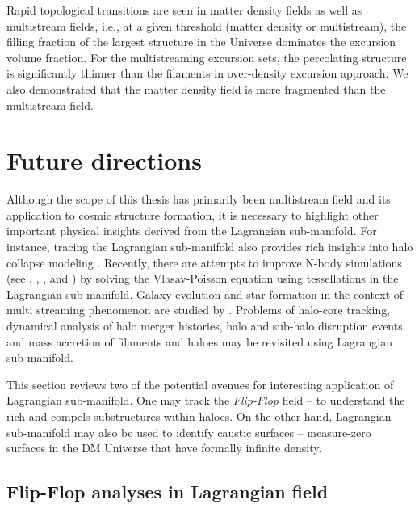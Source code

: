 Rapid topological transitions are seen in matter density fields as well as multistream fields, i.e., at a given threshold (matter density or multistream), the filling fraction of the largest structure in the Universe dominates the excursion volume fraction. For the multistreaming excursion sets, the percolating structure is significantly thinner than the filaments in over-density excursion approach. We also demonstrated that the matter density field is more fragmented than the multistream field. 
 

\section{Future directions}

Although the scope of this thesis has primarily been multistream field and its application to cosmic structure formation, it is necessary to highlight other important physical insights derived from the Lagrangian sub-manifold. For instance, tracing the Lagrangian sub-manifold also provides rich insights into halo collapse modeling \cite{Neyrinck2016}. Recently, there are attempts to improve N-body simulations (see \cite{Hahn2013}, \cite{Angulo2013a}, \cite{Angulo2013b}, \cite{Sousbie2015} and \cite{Hahn2016a}) by solving the Vlasav-Poisson equation using tessellations in the Lagrangian sub-manifold. Galaxy evolution and star formation in the context of multi streaming phenomenon are studied by \cite{Aragon-Calvo2016}. Problems of halo-core tracking, dynamical analysis of halo merger histories, halo and sub-halo disruption events and mass accretion of filaments and haloes may be revisited using Lagrangian sub-manifold.

This section reviews two of the potential avenues for interesting application of Lagrangian sub-manifold. One may track the {\it Flip-Flop} field -- to understand the rich and compels substructures within haloes. On the other hand, Lagrangian sub-manifold may also be used to identify caustic surfaces -- measure-zero surfaces in the DM Universe that have formally infinite density. 


\subsection{Flip-Flop analyses in Lagrangian field}

